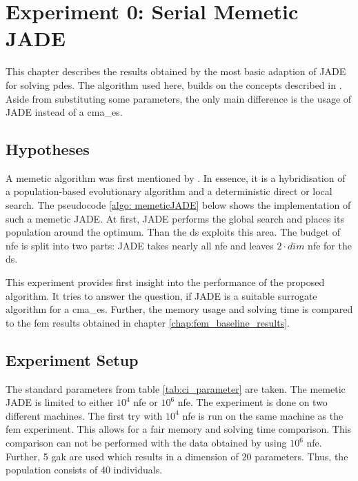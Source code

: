 \documentclass[./\jobname.tex]{subfiles}
\begin{document}
\chapter {Experiment 0: Serial Memetic JADE}
\label{chap:experimet_0}

This chapter describes the results obtained by the most basic adaption of JADE for solving \gls{pde}s. The algorithm used here, builds on the concepts described in \cite{chaquet_using_2019}. Aside from substituting some parameters, the only main difference is the usage of JADE instead of a \gls{cma_es}. 

\section{Hypotheses}
A memetic algorithm was first mentioned by \cite{moscato_evolution_2000}. In essence, it is a hybridisation of a population-based evolutionary algorithm and a deterministic direct or local search. The pseudocode \ref{algo: memeticJADE} below shows the implementation of such a memetic JADE. At first, JADE performs the global search and places its population around the optimum. Than the \gls{ds} exploits this area. The budget of \gls{nfe} is split into two parts: JADE takes nearly all \gls{nfe} and leaves $2\cdot dim$ \gls{nfe} for the \gls{ds}. 

\begin{algorithm}[h]
	\SetAlgoNoLine
	\DontPrintSemicolon
	\label{algo: memeticJADE}
\end{algorithm}

This experiment provides first insight into the performance of the proposed algorithm. It tries to answer the question, if JADE is a suitable surrogate algorithm for a \gls{cma_es}. Further, the memory usage and solving time is compared to the \gls{fem} results obtained in chapter \ref{chap:fem_baseline_results}. 

\section{Experiment Setup}
The standard parameters from table \ref{tab:ci_parameter} are taken. The memetic JADE is limited to either $10^4$ \gls{nfe} or $10^6$ \gls{nfe}. The experiment is done on two different machines. The first try with $10^4$ \gls{nfe} is run on the same machine as the \gls{fem} experiment. This allows for a fair memory and solving time comparison. This comparison can not be performed with the data obtained by using $10^6$ \gls{nfe}. Further, 5 \gls{gak} are used which results in a dimension of 20 parameters. Thus, the population consists of 40 individuals. 
\end{document}
